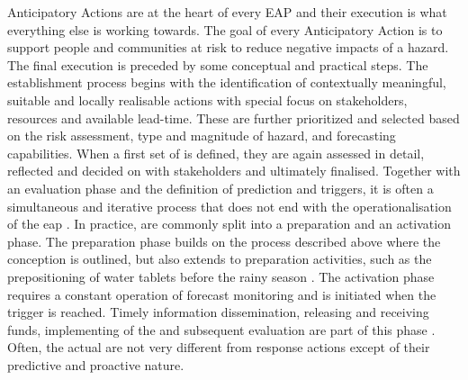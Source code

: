 Anticipatory Actions are at the heart of every EAP and their execution is what everything else is working towards. The goal of every Anticipatory Action is to support people and communities at risk to reduce negative impacts of a hazard. The final execution is preceded by some conceptual and practical steps. The establishment process begins with the identification of contextually meaningful, suitable and locally realisable actions with special focus on stakeholders, resources and available lead-time. These are further prioritized and selected based on the risk assessment, type and magnitude of hazard, and forecasting capabilities. When a first set of  is defined, they are again assessed in detail, reflected and decided on with stakeholders and ultimately finalised. Together with an evaluation phase and the definition of prediction and triggers, it is often a simultaneous and iterative process that does not end with the operationalisation of the \acrshort{eap} \autocite{stephensFORECASTBASEDACTION2015,ifrcGlossaryTermsForecastbased2023,ifrcFbFPractitionersManual2023a,rcrcForecastbasedFinancingEarly2020}.\newline
In practice,  are commonly split into a preparation and an activation phase. The preparation phase builds on the process described above where the conception is outlined, but also extends to preparation activities, such as the prepositioning of water tablets before the rainy season \autocite{stephensFORECASTBASEDACTION2015}. The activation phase requires a constant operation of forecast monitoring and is initiated when the trigger is reached. Timely information dissemination, releasing and receiving funds, implementing of the  and subsequent evaluation are part of this phase \autocite{stephensFORECASTBASEDACTION2015,ifrcFbFPractitionersManual2023a}. Often, the actual  are not very different from response actions except of their predictive and proactive nature. \newline
